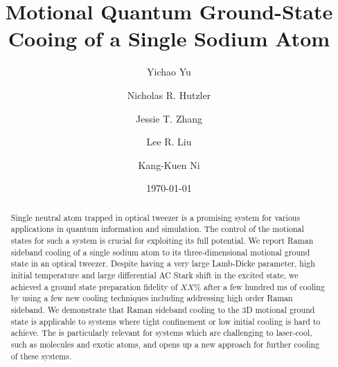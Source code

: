 \documentclass[aps,prl,twocolumn,groupedaddress]{revtex4-1}
\begin{document}
\title{Motional Quantum Ground-State Cooing of a Single Sodium Atom}
\author{Yichao Yu}
\author{Nicholas R. Hutzler}
\author{Jessie T. Zhang}
\author{Lee R. Liu}
\author{Kang-Kuen Ni}

\date{\today}

\begin{abstract}
  Single neutral atom trapped in optical tweezer is a promising system for various applications
  in quantum information and simulation.
  The control of the motional states for such a system is crucial
  for exploiting its full potential.
  We report Raman sideband cooling of a single sodium atom to its three-dimensional
  motional ground state in an optical tweezer.
  Despite having a very large Lamb-Dicke parameter, high initial temperature and
  large differential AC Stark shift in the excited state,
  we achieved a ground state preparation fidelity of $XX\%$ after a few hundred ms of cooling
  by using a few new cooling techniques including addressing high order Raman sideband.
  We demonstrate that Raman sideband cooling to the 3D motional ground state is applicable to
  systems where tight confinement or low initial cooling is hard to achieve.
  The is particularly relevant for systems which are challenging to laser-cool,
  such as molecules and exotic atoms, and opens up a new approach for further cooling
  of these systems.
\end{abstract}

\maketitle
\end{document}
